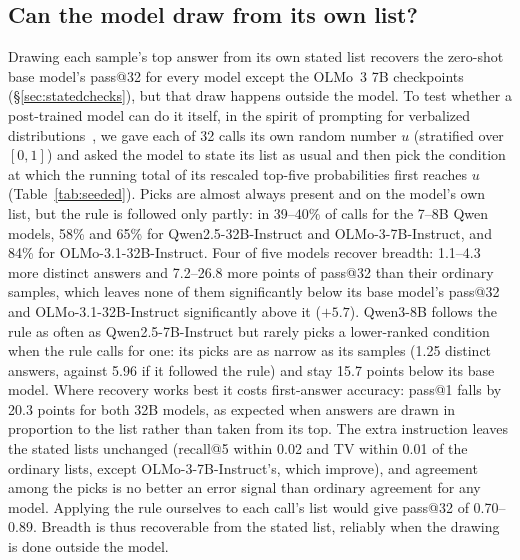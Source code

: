 \documentclass[11pt]{article}
\begin{document}
\subsection{Can the model draw from its own list?}\label{sec:seeded}
Drawing each sample's top answer from its own stated list recovers the zero-shot base model's pass@32 for every model except the OLMo~3 7B checkpoints (\S\ref{sec:statedchecks}), but that draw happens outside the model. To test whether a post-trained model can do it itself, in the spirit of prompting for verbalized distributions~\citep{zhang2025verbalized}, we gave each of 32 calls its own random number $u$ (stratified over $[0,1]$) and asked the model to state its list as usual and then pick the condition at which the running total of its rescaled top-five probabilities first reaches $u$ (Table~\ref{tab:seeded}). Picks are almost always present and on the model's own list, but the rule is followed only partly: in 39--40\% of calls for the 7--8B Qwen models, 58\% and 65\% for Qwen2.5-32B-Instruct and OLMo-3-7B-Instruct, and 84\% for OLMo-3.1-32B-Instruct. Four of five models recover breadth: 1.1--4.3 more distinct answers and 7.2--26.8 more points of pass@32 than their ordinary samples, which leaves none of them significantly below its base model's pass@32 and OLMo-3.1-32B-Instruct significantly above it ($+5.7$). Qwen3-8B follows the rule as often as Qwen2.5-7B-Instruct but rarely picks a lower-ranked condition when the rule calls for one: its picks are as narrow as its samples (1.25 distinct answers, against 5.96 if it followed the rule) and stay 15.7 points below its base model. Where recovery works best it costs first-answer accuracy: pass@1 falls by 20.3 points for both 32B models, as expected when answers are drawn in proportion to the list rather than taken from its top. The extra instruction leaves the stated lists unchanged (recall@5 within 0.02 and TV within 0.01 of the ordinary lists, except OLMo-3-7B-Instruct's, which improve), and agreement among the picks is no better an error signal than ordinary agreement for any model. Applying the rule ourselves to each call's list would give pass@32 of 0.70--0.89. Breadth is thus recoverable from the stated list, reliably when the drawing is done outside the model.
\end{document}
